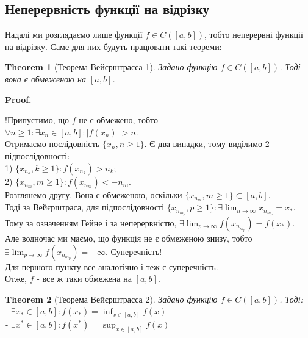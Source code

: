 \documentclass[a4paper, 14pt]{article}
\makeatletter
\def\huge{\displaystyle}
\def\qed{$\blacksquare$}
\theoremstyle{theoremdd}
\newtheorem{theorem}{Theorem}[subsection]
\theoremstyle{theoremdd}
\theoremstyle{theoremdd}
\theoremstyle{theoremdd}
\theoremstyle{theoremdd}
\theoremstyle{theoremdd}
\theoremstyle{theoremdd}
\theoremstyle{theoremdd}
\renewenvironment{proof}[1][Proof.\\]{\par
\pushQED{\hfill \qed}%
\normalfont \topsep6\p@\@plus6\p@\relax
\trivlist
\item\relax
{\bfseries
#1\@addpunct{.}}\hspace\labelsep\ignorespaces
}{%
\popQED\endtrivlist\@endpefalse
}
\makeatother
\begin{document}
\subsection{Неперервність функції на відрізку}
Надалі ми розглядаємо лише функції $f \in C([a,b])$, тобто неперервні функції на відрізку. Саме для них будуть працювати такі теореми:

\begin{theorem}[Теорема Вейєрштрасса 1]
Задано функцію $f \in C([a,b])$. Тоді вона є обмеженою на $[a,b]$.
\end{theorem}

\begin{proof}
!Припустимо, що $f$ не є обмежено, тобто\\
$\forall n \geq 1: \exists x_n \in [a,b]: |f(x_n)| > n$.\\
Отримаємо послідовність $\{x_n,n \geq 1\}$. Є два випадки, тому виділимо 2 підпослідовності:\\
1) $\{x_{n_k}, k \geq 1\}: f(x_{n_k})>n_k$;\\
2) $\{x_{n_m}, m \geq 1\}: f(x_{n_m})<-n_m$.\\
Розглянемо другу. Вона є обмеженою, оскільки $\{x_{n_m}, m \geq 1\} \subset [a,b]$.\\
Тоді за Вейєрштраса, для підпослідовності $\{x_{n_{m_p}}, p \geq 1\}: \exists \huge \lim_{n \to \infty} x_{n_{m_p}} =x_*$.\\
Тому за означенням Гейне і за неперервністю, $\exists \huge \lim_{p \to \infty} f(x_{n_{m_p}}) = f(x_*)$.\\
Але водночас ми маємо, що функція не є обмеженою знизу, тобто $\exists \huge \lim_{p \to \infty} f(x_{n_{m_p}}) = -\infty$. Суперечність!\\
Для першого пункту все аналогічно і теж є суперечність.\\
Отже, $f$ - все ж таки обмежена на $[a,b]$.
\end{proof}

\begin{theorem}[Теорема Вейєрштрасса 2]
Задано функцію $f \in C([a,b])$. Тоді:\\
- $\huge \exists x_* \in [a,b]: f(x_*) = \inf_{x \in [a,b]} f(x)$\\
- $\huge \exists x^* \in [a,b]: f(x^*) = \sup_{x \in [a,b]} f(x)$
\end{theorem}
\end{document}
